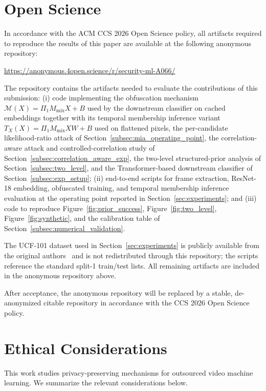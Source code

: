 \documentclass[sigconf,anonymous, review]{acmart}
\begin{document}
\section{Open Science}
\label{app:open_science}

In accordance with the ACM CCS 2026 Open Science policy, all artifacts required to reproduce the results of this paper are available at the following anonymous repository:
\begin{center}
\url{https://anonymous.4open.science/r/security-ml-A066/}
\end{center}

The repository contains the artifacts needed to evaluate the contributions of this submission: (i) code implementing the obfuscation mechanism $\mathcal{M}(X) = \Pi_1 M_{\mathrm{mix}} X + B$ used by the downstream classifier on cached embeddings together with its temporal membership inference variant $T_X(X) = \Pi_1 M_{\mathrm{mix}} X W + B$ used on flattened pixels, the per-candidate likelihood-ratio attack of Section~\ref{subsec:mia_operating_point}, the correlation-aware attack and controlled-correlation study of Section~\ref{subsec:correlation_aware_exp}, the two-level structured-prior analysis of Section~\ref{subsec:two_level}, and the Transformer-based downstream classifier of Section~\ref{subsec:exp_setup}; (ii) end-to-end scripts for frame extraction, ResNet-18 embedding, obfuscated training, and temporal membership inference evaluation at the operating point reported in Section~\ref{sec:experiments}; and (iii) code to reproduce Figure~\ref{fig:prior_success}, Figure~\ref{fig:two_level}, Figure~\ref{fig:synthetic}, and the calibration table of Section~\ref{subsec:numerical_validation}.

The UCF-101 dataset used in Section~\ref{sec:experiments} is publicly available from the original authors~\cite{soomro2012ucf101} and is not redistributed through this repository; the scripts reference the standard split-1 train/test lists. All remaining artifacts are included in the anonymous repository above.

After acceptance, the anonymous repository will be replaced by a stable, de-anonymized citable repository in accordance with the CCS 2026 Open Science policy.

\section{Ethical Considerations}
\label{app:ethics}

This work studies privacy-preserving mechanisms for outsourced video machine learning. We summarize the relevant considerations below.
\end{document}

